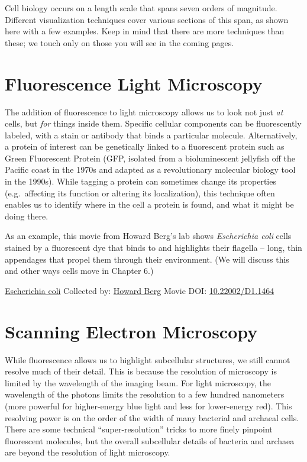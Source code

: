 \documentclass[]{tufte-book}
\begin{document}
Cell biology occurs on a length scale that spans seven orders of magnitude. Different visualization techniques cover various sections of this span, as shown here with a few examples. Keep in mind that there are more techniques than these; we touch only on those you will see in the coming pages.

\hypertarget{fluorescence-light-microscopy}{%
\section{Fluorescence Light Microscopy}\label{fluorescence-light-microscopy}}

The addition of fluorescence to light microscopy allows us to look not just \emph{at} cells, but \emph{for} things inside them. Specific cellular components can be fluorescently labeled, with a stain or antibody that binds a particular molecule. Alternatively, a protein of interest can be genetically linked to a fluorescent protein such as Green Fluorescent Protein (GFP, isolated from a bioluminescent jellyfish off the Pacific coast in the 1970s and adapted as a revolutionary molecular biology tool in the 1990s). While tagging a protein can sometimes change its properties (e.g.~affecting its function or altering its localization), this technique often enables us to identify where in the cell a protein is found, and what it might be doing there.

As an example, this movie from Howard Berg's lab \citep{bergInternet} \citep{turner2000} shows \emph{Escherichia coli} cells stained by a fluorescent dye that binds to and highlights their flagella -- long, thin appendages that propel them through their environment. (We will discuss this and other ways cells move in Chapter 6.)



\hypertarget{htmlwidget-03104d8555798e71d21e}{}

\label{fig:1-2}\protect\hyperlink{tree}{Escherichia coli} Collected by: \protect\hyperlink{howard_berg}{Howard Berg} Movie DOI: \href{https://doi.org/10.22002/D1.1464}{10.22002/D1.1464}

\hypertarget{scanning-electron-microscopy}{%
\section{Scanning Electron Microscopy}\label{scanning-electron-microscopy}}

While fluorescence allows us to highlight subcellular structures, we still cannot resolve much of their detail. This is because the resolution of microscopy is limited by the wavelength of the imaging beam. For light microscopy, the wavelength of the photons limits the resolution to a few hundred nanometers (more powerful for higher-energy blue light and less for lower-energy red). This resolving power is on the order of the width of many bacterial and archaeal cells. There are some technical ``super-resolution'' tricks to more finely pinpoint fluorescent molecules, but the overall subcellular details of bacteria and archaea are beyond the resolution of light microscopy.
\end{document}

